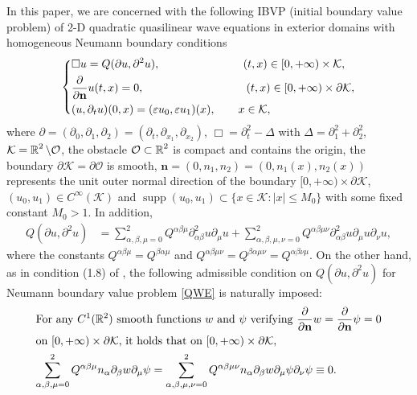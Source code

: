 \documentclass[11pt,twoside]{article}
\def\cK{\mathcal K}
\def\cO{\mathcal O}
\def\R{\mathop{\mathbb R\kern 0pt}\nolimits}
\def\ds{\displaystyle}
\def\supp{\mathop{\rm supp}\nolimits}
\def\p{\partial}
\def\ve{\varepsilon}
\def\supp{\operatorname{supp}}
\def\bn{\mathbf{n}}
\theoremstyle{plain}
\theoremstyle{definition}
\numberwithin{equation}{section}
\begin{document}
In this paper, we are concerned with the following IBVP (initial boundary value problem) of 2-D quadratic
quasilinear wave equations in exterior domains with homogeneous Neumann boundary conditions
\begin{equation}\label{QWE}
\left\{
\begin{aligned}
&\Box u=Q(\p u,\p^2u),\hspace{2.6cm} (t,x)\in[0,+\infty)\times\cK,\\
&\frac{\p}{\p\bn}u(t,x)=0,\hspace{3.2cm} (t,x)\in[0,+\infty)\times\p\cK,\\
&(u,\p_tu)(0,x)=(\ve u_0,\ve u_1)(x),\qquad x\in\cK,
\end{aligned}
\right.
\end{equation}
where $\p=(\p_0,\p_1,\p_2)=(\p_t,\p_{x_1},\p_{x_2})$, $\ds\Box=\p_t^2-\Delta$ with $\Delta=\p_1^2+\p_2^2$, $\cK=\R^2\setminus\cO$,
the obstacle $\cO\subset\R^2$ is compact and contains the origin, the boundary $\p\cK=\p\cO$ is smooth, $\bn=(0, n_1,n_2)=(0, n_1(x),n_2(x))$ represents the unit outer normal direction of the boundary $[0,+\infty)\times\p\cK$,
$(u_0,u_1)\in C^\infty(\cK)$ and $\supp(u_0,u_1)\subset\{x\in\cK:|x|\le M_0\}$ with some fixed constant $M_0>1$.
In addition,
\begin{equation}\label{YHCC-1}
\begin{split}
Q(\p u,\p^2u)&=\sum_{\alpha,\beta,\mu=0}^2Q^{\alpha\beta\mu}\p^2_{\alpha\beta}u\p_{\mu}u
+\sum_{\alpha,\beta,\mu,\nu=0}^2Q^{\alpha\beta\mu\nu}\p^2_{\alpha\beta}u\p_{\mu}u\p_{\nu}u,
\end{split}
\end{equation}
where the constants $Q^{\alpha\beta\mu}=Q^{\beta\alpha\mu}$ and $Q^{\alpha\beta\mu\nu}=Q^{\beta\alpha\mu\nu}=Q^{\alpha\beta\nu\mu}$.
On the other hand, as in condition (1.8) of \cite{MSS}, the following admissible condition on $Q(\p u,\p^2u)$ for Neumann boundary
value problem \eqref{QWE} is naturally imposed:
\begin{equation}\label{YHCC-2}
\begin{split}
&\text{For any $C^1(\Bbb R^2)$ smooth functions $w$ and $\psi$ verifying $\frac{\p}{\p\bn}w
=\frac{\p}{\p\bn}\psi=0$}\\
&\text{on $[0,+\infty)\times\p\cK$, it holds that on $[0,+\infty)\times\p\cK$},\\
&{\sum_{\alpha,\beta,\mu=0}^2Q^{\alpha\beta\mu}n_{\alpha}\p_{\beta}w\p_{\mu}\psi=\sum_{\alpha,\beta,\mu,\nu=0}^2
Q^{\alpha\beta\mu\nu}n_{\alpha}\p_{\beta}w\p_{\mu}\psi\p_{\nu}\psi\equiv 0.}
\end{split}
\end{equation}
\end{document}
